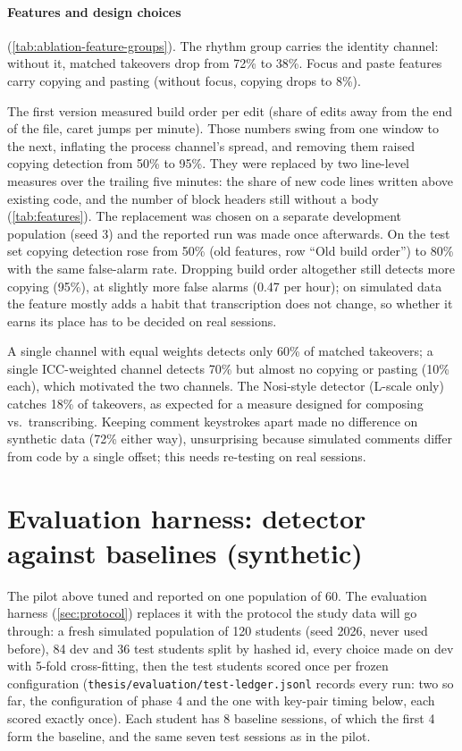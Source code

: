 \paragraph{Features and design choices} (\cref{tab:ablation-feature-groups}).
The rhythm group carries the identity channel: without it, matched
takeovers drop from 72\% to 38\%. Focus and paste features carry copying
and pasting (without focus, copying drops to 8\%).

The first version measured build order per edit (share of edits away from
the end of the file, caret jumps per minute). Those numbers swing from one
window to the next, inflating the process channel's spread, and removing
them raised copying detection from 50\% to 95\%. They were replaced by two
line-level measures over the trailing five minutes: the share of new code
lines written above existing code, and the number of block headers still
without a body (\cref{tab:features}). The replacement was chosen on a
separate development population (seed 3) and the reported run was made
once afterwards. On the test set copying detection rose from 50\% (old
features, row ``Old build order'') to 80\% with the same false-alarm rate.
Dropping build order altogether still detects more copying (95\%), at
slightly more false alarms (0.47 per hour); on simulated data the feature
mostly adds a habit that transcription does not change, so whether it
earns its place has to be decided on real sessions.

A single channel with equal weights detects only 60\% of matched
takeovers; a single ICC-weighted channel detects 70\% but almost no copying
or pasting (10\% each), which motivated the two channels. The Nosi-style
detector (L-scale only) catches 18\% of takeovers, as expected for a
measure designed for composing vs.\ transcribing. Keeping comment
keystrokes apart made no difference on synthetic data (72\% either way),
unsurprising because simulated comments differ from code by a single
offset; this needs re-testing on real sessions.

\section{Evaluation harness: detector against baselines (synthetic)}
\label{sec:rq1-harness}
The pilot above tuned and reported on one population of 60. The evaluation
harness (\cref{sec:protocol}) replaces it with the protocol the study data will
go through: a fresh simulated population of 120 students (seed 2026, never used
before), 84 dev and 36 test students split by hashed id, every choice made on dev
with 5-fold cross-fitting, then the test students scored once per frozen
configuration (\texttt{thesis/evaluation/test-ledger.jsonl} records every run:
two so far, the configuration of phase 4 and the one with key-pair timing
below, each scored exactly once). Each
student has 8 baseline sessions, of which the first 4 form the baseline, and the
same seven test sessions as in the pilot.

